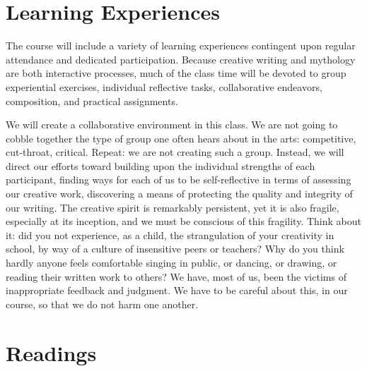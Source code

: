 \documentclass[10pt,DIV09,letterpaper,oneside,headsepline]{scrreprt}
\begin{document}
\section{Learning Experiences}
The course will include a variety of learning experiences contingent upon regular attendance and dedicated participation. Because creative writing and mythology are both interactive processes, much of the class time will be devoted to group experiential exercises, individual reflective tasks, collaborative endeavors, composition, and practical assignments.

We will create a collaborative environment in this class. We are not going to cobble together the type of group one often hears about in the arts: competitive, cut-throat, critical. Repeat: we are not creating such a group. Instead, we will direct our efforts toward building upon the individual strengths of each participant, finding ways for each of us to be self-reflective in terms of assessing our creative work, discovering a means of protecting the quality and integrity of our writing. The creative spirit is remarkably persistent, yet it is also fragile, especially at its inception, and
we must be conscious of this fragility. Think about it: did you not experience, as a child, the strangulation of your creativity in school, by way of a culture of insensitive peers or teachers? Why do you think hardly anyone feels comfortable singing in public, or dancing, or drawing, or reading their written work to others? We have, most of us, been the victims of inappropriate feedback and judgment. We have to be careful about this, in our course, so that we do not harm one another.

\section{Readings}
\end{document}

